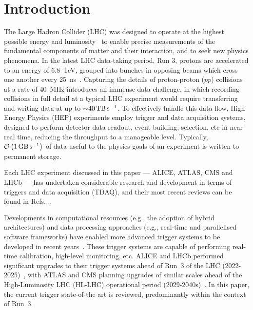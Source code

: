 \section{Introduction}


The Large Hadron Collider (LHC) was designed to operate at the highest possible energy and luminosity~\cite{CERN:lhc-design-report} to enable precise measurements of the fundamental components of matter and their interaction, and to seek new physics phenomena. 
In the latest LHC data-taking period, Run 3, protons are accelerated to an energy of \SI{6.8}{\tera\electronvolt}, grouped into bunches in opposing beams which cross one another every \SI{25}{\nano\second}~\cite{CERN:lhc-run3-operation}. 
Capturing the details of proton-proton ($pp$) collisions at a rate of \SI{40}{\mega\hertz} introduces an immense data challenge, in which recording collisions in full detail at a typical LHC experiment would require transferring and writing data at up to ${\sim}\SI{40}{\tera\byte\per\second}$. 
To effectively handle this data flow, High Energy Physics (HEP) experiments employ trigger and data acquisition systems, designed to perform detector data readout, event-building, selection, etc in near-real time, reducing the throughput to a manageable level. Typically, $\mathcal{O}\left(\SI{1}{\giga\byte\per\second}\right)$ of data useful to the physics goals of an experiment is written to permanent storage.

Each LHC experiment discussed in this paper — ALICE, ATLAS, CMS and LHCb — has undertaken considerable research and development in terms of triggers and data acquisition (TDAQ), and their most recent reviews can be found in Refs.~\cite{alice-performance-paper-run1, ATLASTriggerRun3, CMS:run3-detector, LHCb:upgrade_trigger_TDR}.

Developments in computational resources (e.g., the adoption of hybrid architectures) and data processing approaches (e.g., real-time and parallelised software frameworks) have enabled more advanced trigger systems to be developed in recent years~\cite{GPUs-for-hep}. These trigger systems are capable of performing real-time calibration, high-level monitoring, etc. ALICE and LHCb performed significant upgrades to their trigger systems ahead of Run~3 of the LHC (2022-2025)~\cite{alice-upgrade, LHCb:2023hlw}, with ATLAS and CMS planning upgrades of similar scales ahead of the High-Luminosity LHC (HL-LHC) operational period (2029-2040s)~\cite{ATLAS:upgrade-scoping, CMS:upgrade-hllhc}.
In this paper, the current trigger state-of-the art is reviewed, predominantly within the context of Run~3.

